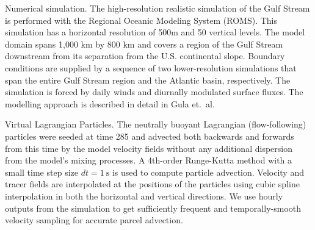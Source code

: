 \documentclass{natureJMK}
\begin{document}
Numerical simulation. The high-resolution realistic simulation of the Gulf Stream is performed with the Regional Oceanic Modeling System (ROMS\cite{shchepetkinmcwilliams05}). This simulation has a horizontal resolution of 500m and 50 vertical levels. The model domain spans 1,000 km by 800 km and covers a region of the Gulf Stream downstream from its separation from the U.S. continental slope. Boundary conditions are supplied by a sequence of two lower-resolution simulations that span the entire Gulf Stream region and the Atlantic basin, respectively. The simulation is forced by daily winds and diurnally modulated surface fluxes. The modelling approach is described in detail in Gula et.\ al\cite{gulaetal15}.

Virtual Lagrangian Particles.  The neutrally buoyant Lagrangian (flow-following) particles were seeded at time 285 and advected both backwards and forwards from this time by the model velocity fields without any additional dispersion from the model's mixing processes\cite{gulaetal14}. A 4th-order Runge-Kutta method with a small time step size $dt = 1\ \mathrm{s}$ is used to compute particle advection. Velocity and tracer fields are interpolated at the positions of the particles using cubic spline interpolation in both the horizontal and vertical directions.  We use hourly outputs from the simulation to get sufficiently frequent and temporally-smooth velocity sampling for accurate parcel advection.
\end{document}
